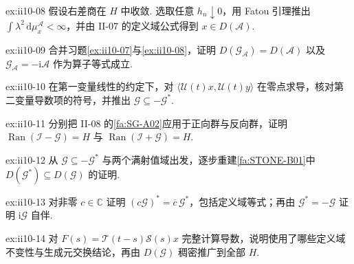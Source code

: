 \begin{FAExercise}{ex:ii10-08}
假设右差商在 \(\displaystyle H\) 中收敛. 选取任意 \(\displaystyle h_n\downarrow0\)，用 Fatou 引理推出 \(\displaystyle\int\lambda^2\,\mathrm{d}\mu_x^{\mathcal A}<\infty\)，并由 II-07 的定义域公式得到 \(\displaystyle x\in D(\mathcal A)\).
\end{FAExercise}

\begin{FAExercise}[自伴算子的精确生成元]{ex:ii10-09}
合并习题\autoref{ex:ii10-07}与\autoref{ex:ii10-08}，证明 \(\displaystyle D(\mathcal G_{\mathcal A})=D(\mathcal A)\) 以及 \(\displaystyle\mathcal G_{\mathcal A}=-\mathrm{i}\mathcal A\) 作为算子等式成立.
\end{FAExercise}

\begin{FAExercise}[酉生成元的斜对称性]{ex:ii10-10}
在第一变量线性的约定下，对 \(\displaystyle\langle\mathcal U(t)x,\mathcal U(t)y\rangle\) 在零点求导，核对第二变量导数项的符号，并推出 \(\displaystyle\mathcal G\subseteq-\mathcal G^*\).
\end{FAExercise}

\begin{FAExercise}[正负值域满射]{ex:ii10-11}
分别把 II-08 的\autoref{fa:SG-A02}应用于正向群与反向群，证明 \(\displaystyle\operatorname{Ran}(\mathcal I-\mathcal G)=H\) 与 \(\displaystyle\operatorname{Ran}(\mathcal I+\mathcal G)=H\).
\end{FAExercise}

\begin{FAExercise}[斜自伴定义域证明]{ex:ii10-12}
从 \(\displaystyle\mathcal G\subseteq-\mathcal G^*\) 与两个满射值域出发，逐步重建\autoref{fa:STONE-B01}中 \(\displaystyle D(\mathcal G^*)\subseteq D(\mathcal G)\) 的证明.
\end{FAExercise}

\begin{FAExercise}[标量伴随规则与 \(\displaystyle\mathcal A=\mathrm{i}\mathcal G\)]{ex:ii10-13}
对非零 \(\displaystyle c\in\mathbb C\) 证明 \(\displaystyle(c\mathcal G)^*=\overline c\,\mathcal G^*\)，包括定义域等式；再由 \(\displaystyle\mathcal G^*=-\mathcal G\) 证明 \(\displaystyle\mathrm{i}\mathcal G\) 自伴.
\end{FAExercise}

\begin{FAExercise}[同生成元半群唯一性]{ex:ii10-14}
对 \(\displaystyle F(s)=\mathcal T(t-s)\mathcal S(s)x\) 完整计算导数，说明使用了哪些定义域不变性与生成元交换结论，再由 \(\displaystyle D(\mathcal G)\) 稠密推广到全部 \(\displaystyle H\).
\end{FAExercise}

